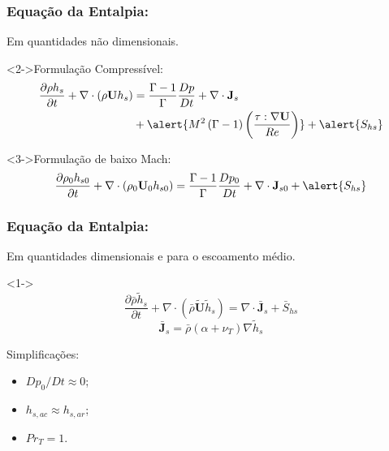 \documentclass[bars,mathserif]{beamer}
\newcommand{\bv}[1]{\mathbf{#1}}
\begin{document}
\begin{frame}
\frametitle{Equação da Entalpia:}
Em quantidades não dimensionais. 
%
\pause
\begin{block}<2->{Formulação Compressível:}
\begin{equation*}
\begin{split}
\frac{\partial \rho h_s}{\partial t} +  \nabla \cdot \left(\rho \bv{U} h_s
\right) &= \frac{\Gamma -1}{\Gamma}\frac{Dp}{Dt} + \nabla \cdot \bv{J}_s \\
&+ \alert{M^2 \left( \Gamma-1 \right) \left( \frac{\bv{\tau} : \nabla\bv{U}}{Re} \right)} + \alert{S_{hs}}
\end{split}
\end{equation*}
\end{block}

\begin{block}<3->{Formulação de baixo Mach:}
\begin{equation*}
\frac{\partial \rho_0 h_{s0}}{\partial t} +  \nabla \cdot \left(\rho_0 \bv{U}_0
h_{s0} \right) = \frac{\Gamma -1}{\Gamma}\frac{Dp_0}{Dt} + \nabla \cdot
\bv{J}_{s0} + \alert{S_{hs}}
\end{equation*}
\end{block}
%
\end{frame}
%
\begin{frame}
\frametitle{Equação da Entalpia:}
Em quantidades dimensionais e para o escoamento médio.
\begin{block}<1->{}
 \begin{equation*}
\frac{\partial \bar{\rho} \tilde{h}_{s}}{\partial t} + \nabla \cdot
\left(\bar{\rho} \tilde{\bv{U}} \tilde{h}_{s} \right) = \nabla \cdot \bar{\bv{J}}_s + \bar{S}_{hs}
\end{equation*} 
\begin{equation*}
\bar{\bv{J}}_s =  \bar{\rho} \left( \alpha + \nu_T\right) \nabla \tilde{h}_s 
\end{equation*}
\end{block}

\vspace{10pt}
\begin{block}{Simplificações:}
 \begin{itemize}
 \item $Dp_0/Dt\approx 0$;
 \item $h_{s,ac} \approx h_{s,ar}$;
 \item $Pr_T = 1$.
 \end{itemize}

\end{block}

\end{frame}
\end{document}
